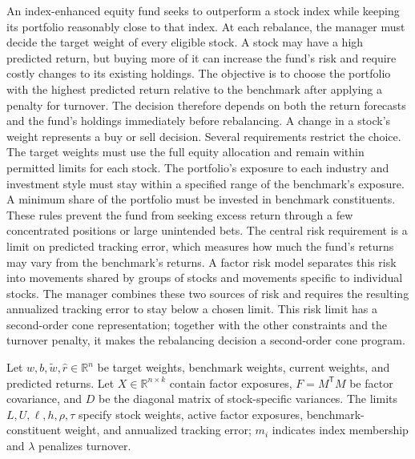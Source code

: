 \documentclass[12pt,a4paper]{article}
\begin{document}
\makeassignmenttitle

\begin{problem}
An index-enhanced equity fund seeks to outperform a stock index while keeping its portfolio reasonably close to that index. At each rebalance, the manager must decide the target weight of every eligible stock. A stock may have a high predicted return, but buying more of it can increase the fund's risk and require costly changes to its existing holdings.
The objective is to choose the portfolio with the highest predicted return relative to the benchmark after applying a penalty for turnover. The decision therefore depends on both the return forecasts and the fund's holdings immediately before rebalancing. A change in a stock's weight represents a buy or sell decision.
Several requirements restrict the choice. The target weights must use the full equity allocation and remain within permitted limits for each stock. The portfolio's exposure to each industry and investment style must stay within a specified range of the benchmark's exposure. A minimum share of the portfolio must be invested in benchmark constituents. These rules prevent the fund from seeking excess return through a few concentrated positions or large unintended bets.
The central risk requirement is a limit on predicted tracking error, which measures how much the fund's returns may vary from the benchmark's returns. A factor risk model separates this risk into movements shared by groups of stocks and movements specific to individual stocks. The manager combines these two sources of risk and requires the resulting annualized tracking error to stay below a chosen limit. This risk limit has a second-order cone representation; together with the other constraints and the turnover penalty, it makes the rebalancing decision a second-order cone program.

Let \(w,b,\widetilde w,\widehat r\in\mathbb R^n\) be target weights,
benchmark weights, current weights, and predicted returns.
Let \(X\in\mathbb R^{n\times k}\) contain factor exposures,
\(F=M^{\mathsf T}M\) be factor covariance, and
\(D\) be the diagonal matrix of stock-specific variances.
The limits \(L,U,\ell,h,\rho,\tau\) specify stock weights, active factor
exposures, benchmark-constituent weight, and annualized tracking error;
\(m_i\) indicates index membership and \(\lambda\) penalizes turnover.


\end{problem}
\end{document}
